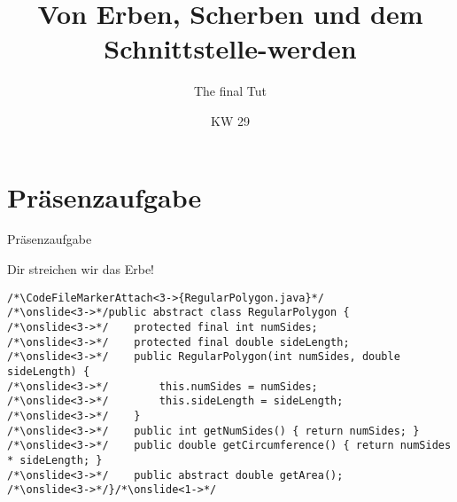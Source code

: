 \relax\relax

\iffull
\title{Von Erben, Scherben und dem Schnittstelle-werden}
\subtitle{The final Tut}
\date{KW 29}

\fi
{}

\iffull
\titleframe

\fi

\fi

\iffalse
\section{Präsenzaufgabe}
{
\begin{frame}[fragile,c]{Präsenzaufgabe}
\begin{aufgabe}{Dir streichen wir das Erbe!}
%
%
\begin{verbatim}
/*\CodeFileMarkerAttach<3->{RegularPolygon.java}*/
/*\onslide<3->*/public abstract class RegularPolygon {
/*\onslide<3->*/    protected final int numSides;
/*\onslide<3->*/    protected final double sideLength;
/*\onslide<3->*/    public RegularPolygon(int numSides, double sideLength) {
/*\onslide<3->*/        this.numSides = numSides;
/*\onslide<3->*/        this.sideLength = sideLength;
/*\onslide<3->*/    }
/*\onslide<3->*/    public int getNumSides() { return numSides; }
/*\onslide<3->*/    public double getCircumference() { return numSides * sideLength; }
/*\onslide<3->*/    public abstract double getArea();
/*\onslide<3->*/}/*\onslide<1->*/
\end{verbatim}\vspace*{-.5\baselineskip}\par
\footnotesize{}\vspace*{-.45\baselineskip}
\end{aufgabe}
\end{frame}
}


